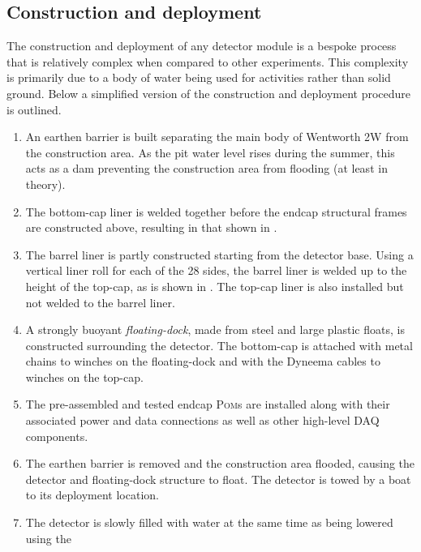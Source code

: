 \subsection{Construction and deployment} %
\label{sec:chips_detector_deployment} %

The construction and deployment of any \chips detector module is a bespoke process that is
relatively complex when compared to other experiments. This complexity is primarily due to a body
of water being used for activities rather than solid ground. Below a simplified version of the
\chipsfive construction and deployment procedure is outlined.

\begin{enumerate}
    \item An earthen barrier is built separating the main body of Wentworth 2W from the
          construction area. As the pit water level rises during the summer, this acts as a dam
          preventing the construction area from flooding (at least in theory).
    \item The bottom-cap liner is welded together before the endcap structural frames are
          constructed above, resulting in that shown in .
    \item The barrel liner is partly constructed starting from the detector base. Using a vertical
          liner roll for each of the 28 sides, the barrel liner is welded up to the height of the
          top-cap, as is shown in . The top-cap liner is also
          installed but not welded to the barrel liner.
    \item A strongly buoyant \emph{floating-dock}, made from steel and large plastic floats, is
          constructed surrounding the detector. The bottom-cap is attached with metal chains to
          winches on the floating-dock and with the Dyneema cables to winches on the top-cap.
    \item The pre-assembled and tested endcap \textsc{Pom}s are installed along with their
          associated power and data connections as well as other high-level DAQ components.
    \item The earthen barrier is removed and the construction area flooded, causing the detector
          and floating-dock structure to float. The detector is towed by a boat to its deployment
          location.
    \item The detector is slowly filled with water at the same time as being lowered using the

\end{enumerate}
